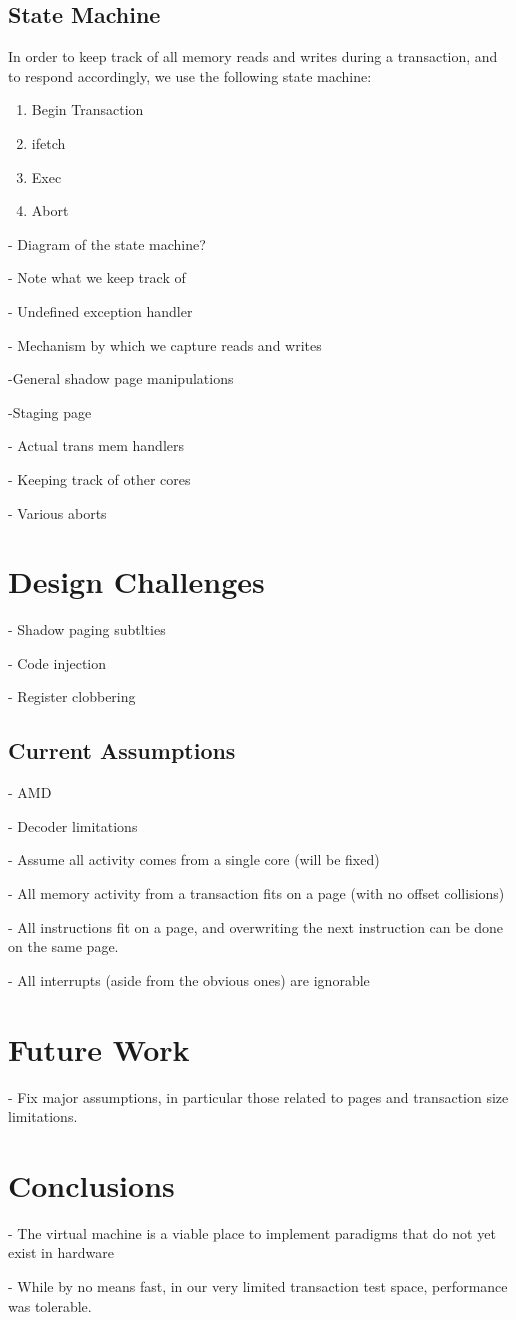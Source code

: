 \documentclass{acm_proc_article-sp}
\begin{document}
\subsection{State Machine}
In order to keep track of all memory reads and writes during a transaction, 
and to respond accordingly, we use the following state machine:
\begin{enumerate}
\item Begin Transaction
\item ifetch
\item Exec
\item Abort 
\end{enumerate}

- Diagram of the state machine?

- Note what we keep track of

- Undefined exception handler

- Mechanism by which we capture reads and writes

    -General shadow page manipulations

    -Staging page

- Actual trans mem handlers

- Keeping track of other cores

- Various aborts

\section{Design Challenges}
- Shadow paging subtlties

- Code injection

- Register clobbering

\subsection{Current Assumptions}
- AMD

- Decoder limitations

- Assume all activity comes from a single core (will be fixed)

- All memory activity from a transaction fits on a page (with no offset collisions)

- All instructions fit on a page, and overwriting the next instruction can be
done on the same page.

- All interrupts (aside from the obvious ones) are ignorable  

\section{Future Work}

- Fix major assumptions, in particular those related to pages and 
transaction size limitations.

\section{Conclusions}

- The virtual machine is a viable place to implement paradigms that do not yet
exist in hardware

- While by no means fast, in our very limited transaction test space, 
performance was tolerable.


\end{document}
